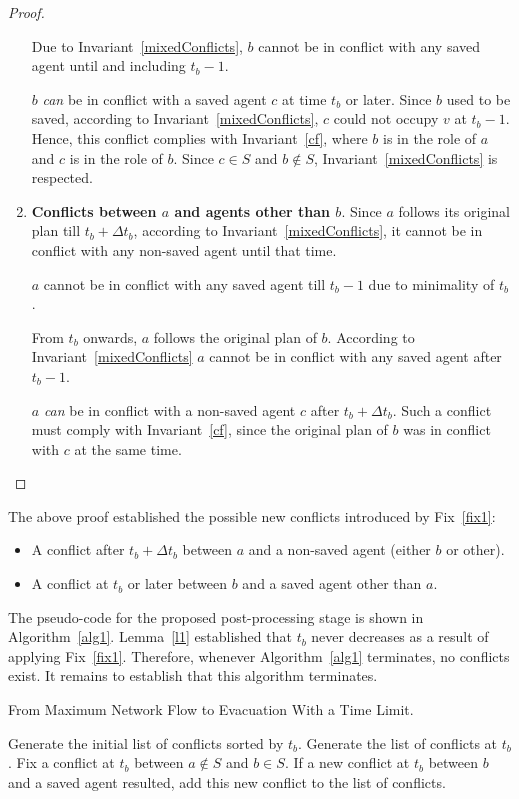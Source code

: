 \documentclass[a4paper,12pt]{article}
\begin{document}
\begin{proof}
\begin{enumerate}
Due to Invariant~\ref{mixedConflicts}, $b$ cannot be in conflict with any saved agent until and including $t_b-1$. 

$b$ {\em can} be in conflict with a saved agent $c$ at time $t_b$ or later. Since $b$ used to be saved, according to Invariant~\ref{mixedConflicts}, $c$ could not occupy $v$ at $t_b-1$. Hence, this conflict complies with Invariant~\ref{cf}, where $b$ is in the role of $a$ and $c$ is in the role of $b$. Since $c\in S$ and $b\notin S$, Invariant~\ref{mixedConflicts} is respected.
 
\item {\bf Conflicts between $a$ and agents other than $b$}. Since $a$ follows its original plan till $t_b+\Delta t_b$, according to Invariant~\ref{mixedConflicts}, it cannot be in conflict with any non-saved agent until that time. 

$a$ cannot be in conflict with any saved agent till $t_b-1$ due to minimality of $t_b$. 

From $t_b$ onwards, $a$ follows the original plan of $b$. According to Invariant~\ref{mixedConflicts} $a$ cannot be in conflict with any saved agent after $t_b-1$. 

$a$ {\em can} be in conflict with a non-saved agent $c$ after $t_b+\Delta t_b$. Such a conflict must comply with Invariant~\ref{cf}, since the original plan of $b$ was in conflict with $c$ at the same time. 
\end{enumerate}
\end{proof}

The above proof established the possible new conflicts introduced by Fix~\ref{fix1}:
\begin{itemize}
\item A conflict after $t_b+\Delta t_b$ between $a$ and a non-saved agent (either $b$ or other). 
\item A conflict at $t_b$ or later between $b$ and a saved agent other than $a$.
\end{itemize}

The pseudo-code for the proposed post-processing stage is shown in Algorithm~\ref{alg1}. Lemma~\ref{l1} established that $t_b$ never decreases as a result of applying Fix~\ref{fix1}. Therefore, whenever Algorithm~\ref{alg1} terminates, no conflicts exist. It remains to establish that this algorithm terminates. 

\begin{algorithm}[t!]
\begin{algorithmic}[1]
\caption{From Maximum Network Flow to Evacuation With a Time Limit.}
\label{alg1}
\STATE Generate the initial list of conflicts sorted by $t_b$.
\STATE Generate the list of conflicts at $t_b$.
\STATE Fix a conflict at $t_b$ between $a\notin S$ and $b\in S$.
\STATE If a new conflict at $t_b$ between $b$ and a saved agent resulted, add this new conflict to the list of conflicts.
\ENDWHILE
\ENDFOR
\end{algorithmic}
\end{algorithm}
\end{document}
